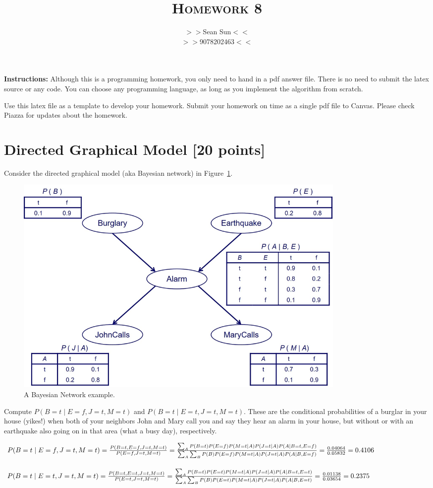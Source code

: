 \documentclass[a4paper]{article}
\title{\textsc{Homework 8}} %
\author{
$>>$Sean Sun$<<$ \\
$>>$9078202463$<<$\\
}
\date{}
\theoremstyle{definition}
\newenvironment{soln}{
    \leavevmode\color{blue}\ignorespaces
}{}
\begin{document}
\maketitle 


\textbf{Instructions:} 
Although this is a programming homework, you only need to hand in a pdf answer file.
There is no need to submit the latex source or any code.
You can choose any programming language, as long as you implement the algorithm from scratch.

Use this latex file as a template to develop your homework.
Submit your homework on time as a single pdf file to Canvas.
Please check Piazza for updates about the homework.


\section{Directed Graphical Model [20 points]}
Consider the directed graphical model (aka Bayesian network) in Figure~\ref{fig:bn}.
\begin{figure}[H]
        \centering
                \includegraphics[width=0.8\textwidth]{BN.jpg}
        \caption{A Bayesian Network example.}
        \label{fig:bn}
\end{figure}
Compute $P(B=t \mid E=f,J=t,M=t)$ and $P(B=t \mid E=t,J=t,M=t)$.
These are the conditional probabilities of a burglar in your house (yikes!) when both of your neighbors John and Mary call you and say they hear an alarm in your house, but without or with an earthquake also going on in that area (what a busy day), respectively.

\begin{soln}

$P(B=t \mid E=f,J=t,M=t)\\
 = \frac{P(B=t, E=f,J=t,M=t)}{P(E=f,J=t,M=t) }
 = 
\frac{\sum_A {P(B=t)P(E=f)P(M=t \mid A)P(J=t \mid A)P(A \mid B=t, E=f)}}
{\sum_A {\sum_B P(B)P(E=f)P(M=t \mid A)P(J=t \mid A)P(A \mid B, E=f)}}
= \frac{0.04064}{0.05832} 
\\= 0.4106 $\\\\
$P(B=t \mid E=t,J=t,M=t) 
\\= \frac{P(B=t, E=t,J=t,M=t)}{P(E=t,J=t,M=t)}
 = 
\frac{\sum_A {P(B=t)P(E=t)P(M=t \mid A)P(J=t \mid A)P(A \mid B=t, E=t)}}
{\sum_A {\sum_B P(B)P(E=t)P(M=t \mid A)P(J=t \mid A)P(A \mid B, E=t)}}= \frac{0.01138}{0.03654}
\\=0.2375
 $
\end{soln}
\end{document}
